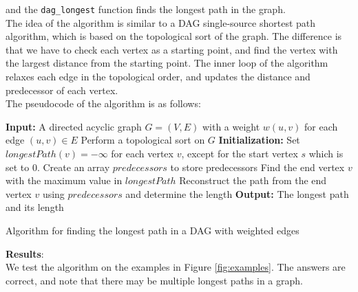 \documentclass[UTF8]{ctexart}
\begin{document}
and the \texttt{dag\_longest} function finds the longest path in the graph.\\
The idea of the algorithm is similar to a DAG single-source shortest path algorithm, which is based on the topological sort of the graph.
The difference is that we have to check each vertex as a starting point, and find the vertex with the largest distance from the starting point.
The inner loop of the algorithm relaxes each edge in the topological order, and updates the distance and predecessor of each vertex.\\
The pseudocode of the algorithm is as follows:\\
\begin{algorithm}[H]
  \SetAlgoLined
  \textbf{Input:} A directed acyclic graph \( G = (V, E) \) with a weight \( w(u, v) \) for each edge \( (u, v) \in E \)\;
  Perform a topological sort on \( G \)\;
   {
    \textbf{Initialization:} Set \( longestPath(v) = -\infty \) for each vertex \( v \), except for the start vertex $s$ which is set to 0. Create an array \( predecessors \) to store predecessors\;
     {
       {
      }
    }
  }
  Find the end vertex \( v \) with the maximum value in \( longestPath \)\;
  Reconstruct the path from the end vertex \( v \) using \( predecessors \) and determine the length\;
  \textbf{Output:} The longest path and its length\;
  
  \caption{Algorithm for finding the longest path in a DAG with weighted edges}
\end{algorithm}
\textbf{\large Results}:\\
We test the algorithm on the examples in Figure \ref{fig:examples}. The answers are correct, and note that there may be multiple longest paths in a graph.\\
\end{document}
